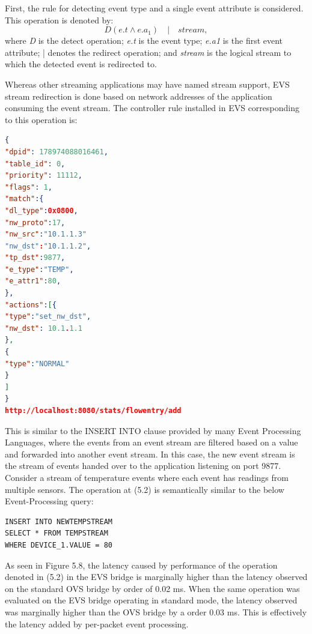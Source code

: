 First, the rule for detecting event type and  a single event attribute is considered. This operation is denoted by: \begin{equation} D(e.t  \wedge e.a_1) \quad | \quad stream,  \end{equation}
where \textit{D} is the detect operation; \newline
\textit{e.t} is the event type; \newline
\textit{e.a1} is the first event attribute; \newline
| denotes the redirect operation; \newline
and \textit{stream} is the logical stream to which the detected event is redirected to. \newline \newline

Whereas other streaming applications may have named stream support, EVS stream redirection is done based on network addresses of the application consuming the event stream. The controller rule installed in EVS corresponding to this operation is:

\begin{lstlisting}[language=json,firstnumber=1]
{
"dpid": 178974088016461,
"table_id": 0,
"priority": 11112,
"flags": 1,
"match":{
"dl_type":0x0800,
"nw_proto":17,
"nw_src":"10.1.1.3"
"nw_dst":"10.1.1.2",
"tp_dst":9877,
"e_type":"TEMP",
"e_attr1":80,
},
"actions":[{
"type":"set_nw_dst",
"nw_dst": 10.1.1.1
},
{
"type":"NORMAL"
}
]
}
http://localhost:8080/stats/flowentry/add \end{lstlisting}

This is similar to the INSERT INTO clause provided by many Event Processing Languages, where the events from an event stream are filtered based on a value and forwarded into another event stream. In this case, the new event stream is the stream of events handed over to the application listening on port 9877. Consider a stream of temperature events where each event has readings from multiple sensors. The operation at (5.2) is semantically similar to the below Event-Processing  query:

\begin{verbatim}
INSERT INTO NEWTEMPSTREAM
SELECT * FROM TEMPSTREAM
WHERE DEVICE_1.VALUE = 80
\end{verbatim}

As seen in Figure 5.8, the latency caused by performance of the operation denoted in (5.2) in the EVS bridge is marginally higher than the latency observed on the standard OVS bridge by order of 0.02 ms. When the same operation was evaluated on the EVS bridge operating in standard mode, the latency observed was marginally higher than the OVS bridge by a order 0.03 ms. This is effectively the latency added by per-packet event processing. 

